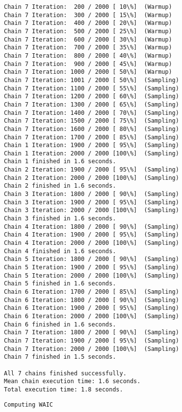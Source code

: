 \documentclass[11pt]{article}
\begin{document}
\begin{Verbatim}[commandchars=\\\{\}]
Chain 7 Iteration:  200 / 2000 [ 10\%]  (Warmup)
Chain 7 Iteration:  300 / 2000 [ 15\%]  (Warmup)
Chain 7 Iteration:  400 / 2000 [ 20\%]  (Warmup)
Chain 7 Iteration:  500 / 2000 [ 25\%]  (Warmup)
Chain 7 Iteration:  600 / 2000 [ 30\%]  (Warmup)
Chain 7 Iteration:  700 / 2000 [ 35\%]  (Warmup)
Chain 7 Iteration:  800 / 2000 [ 40\%]  (Warmup)
Chain 7 Iteration:  900 / 2000 [ 45\%]  (Warmup)
Chain 7 Iteration: 1000 / 2000 [ 50\%]  (Warmup)
Chain 7 Iteration: 1001 / 2000 [ 50\%]  (Sampling)
Chain 7 Iteration: 1100 / 2000 [ 55\%]  (Sampling)
Chain 7 Iteration: 1200 / 2000 [ 60\%]  (Sampling)
Chain 7 Iteration: 1300 / 2000 [ 65\%]  (Sampling)
Chain 7 Iteration: 1400 / 2000 [ 70\%]  (Sampling)
Chain 7 Iteration: 1500 / 2000 [ 75\%]  (Sampling)
Chain 7 Iteration: 1600 / 2000 [ 80\%]  (Sampling)
Chain 7 Iteration: 1700 / 2000 [ 85\%]  (Sampling)
Chain 1 Iteration: 1900 / 2000 [ 95\%]  (Sampling)
Chain 1 Iteration: 2000 / 2000 [100\%]  (Sampling)
Chain 1 finished in 1.6 seconds.
Chain 2 Iteration: 1900 / 2000 [ 95\%]  (Sampling)
Chain 2 Iteration: 2000 / 2000 [100\%]  (Sampling)
Chain 2 finished in 1.6 seconds.
Chain 3 Iteration: 1800 / 2000 [ 90\%]  (Sampling)
Chain 3 Iteration: 1900 / 2000 [ 95\%]  (Sampling)
Chain 3 Iteration: 2000 / 2000 [100\%]  (Sampling)
Chain 3 finished in 1.6 seconds.
Chain 4 Iteration: 1800 / 2000 [ 90\%]  (Sampling)
Chain 4 Iteration: 1900 / 2000 [ 95\%]  (Sampling)
Chain 4 Iteration: 2000 / 2000 [100\%]  (Sampling)
Chain 4 finished in 1.6 seconds.
Chain 5 Iteration: 1800 / 2000 [ 90\%]  (Sampling)
Chain 5 Iteration: 1900 / 2000 [ 95\%]  (Sampling)
Chain 5 Iteration: 2000 / 2000 [100\%]  (Sampling)
Chain 5 finished in 1.6 seconds.
Chain 6 Iteration: 1700 / 2000 [ 85\%]  (Sampling)
Chain 6 Iteration: 1800 / 2000 [ 90\%]  (Sampling)
Chain 6 Iteration: 1900 / 2000 [ 95\%]  (Sampling)
Chain 6 Iteration: 2000 / 2000 [100\%]  (Sampling)
Chain 6 finished in 1.6 seconds.
Chain 7 Iteration: 1800 / 2000 [ 90\%]  (Sampling)
Chain 7 Iteration: 1900 / 2000 [ 95\%]  (Sampling)
Chain 7 Iteration: 2000 / 2000 [100\%]  (Sampling)
Chain 7 finished in 1.5 seconds.

All 7 chains finished successfully.
Mean chain execution time: 1.6 seconds.
Total execution time: 1.8 seconds.

    \end{Verbatim}

    \begin{Verbatim}[commandchars=\\\{\}]
Computing WAIC

    \end{Verbatim}
\end{document}

